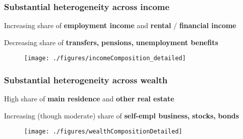 \documentclass[pdflatex,aspectratio=169]{beamer}
\begin{document}
\begin{frame}\frametitle{\bf Substantial heterogeneity across income}
\bi
\item Increasing share of \textbf{\color{ao}employment income} and \textbf{\color{jgreen}rental} / \textbf{\color{red}financial income}
\item Decreasing share of \textbf{\color{amethyst} transfers,} \textbf{\color{amber} pensions,} \textbf{\color{applegreen} unemployment benefits}
\ei



\vspace*{-2.5mm}
\begin{figure}
\begin{center}
\texttt{[image: ./figures/incomeComposition\_detailed]}
\end{center}
\end{figure}

\end{frame}


\begin{frame}\frametitle{\bf Substantial heterogeneity across wealth \hypertarget{WealthSim}{}}

\bi
\item High share of \textbf{\color{ao}main residence} and \textbf{\color{capri} other real estate}
\item Increasing (though moderate) share of \textbf{\color{amber} self-empl business,} \textbf{\color{red} stocks,} \textbf{\color{jgreen} bonds}
\ei
{}
\vspace*{-2.5mm}
\begin{figure}
\begin{center}
\texttt{[image: ./figures/wealthCompositionDetailed]} %
\end{center}
\end{figure}
\end{frame}
\end{document}
